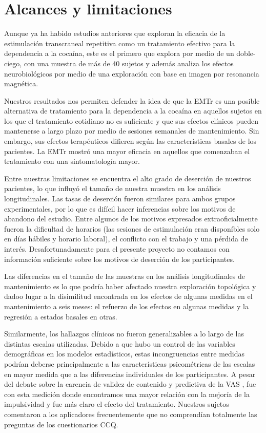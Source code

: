 \section{Alcances y limitaciones}
Aunque ya ha habido estudios anteriores que exploran la eficacia de la estimulación transcraneal repetitiva como un tratamiento efectivo para la dependencia a la cocaína, este es el primero que explora por medio de un doble-ciego, con una muestra de más de 40 sujetos y además analiza los efectos neurobiológicos por medio de una exploración con base en imagen por resonancia magnética. \par
Nuestros resultados nos permiten defender la idea de que la EMTr es una posible alternativa de tratamiento para la dependencia a la cocaína en aquellos sujetos en los que el tratamiento cotidiano no es suficiente y que sus efectos clínicos pueden mantenerse a largo plazo por medio de sesiones semanales de mantenimiento. Sin embargo, sus efectos terapéuticos difieren según las características basales de los pacientes. La EMTr mostró una mayor eficacia en aquellos que comenzaban el tratamiento con una sintomatología mayor. \par
Entre nuestras limitaciones se encuentra el alto grado de deserción de nuestros pacientes, lo que influyó el tamaño de nuestra muestra en los análisis longitudinales. Las tasas de deserción fueron similares para ambos grupos experimentales, por lo que es difícil hacer inferencias sobre los motivos de abandono del estudio. Entre algunos de los motivos expresados extraoficialmente fueron la dificultad de horarios (las sesiones de estimulación eran disponíbles solo en días hábiles y horario laboral), el conflicto con el trabajo y una pérdida de interés. Desafortunadamente para el presente proyecto no contamos con información suficiente sobre los motivos de deserción de los participantes.\par
Las diferencias en el tamaño de las muestras en los análisis longitudinales de mantenimiento es lo que podría haber afectado nuestra exploración topológica y dadoo lugar a la disimilitud encontrada en los efectos de algunas medidas en el mantenimiento a seis meses: el refuerzo de los efectos en algunas medidas y la regresión a estados basales en otras. \par
Similarmente, los hallazgos clínicos no fueron generalizables a lo largo de las distintas escalas utilizadas. Debido a que hubo un control de las variables demográficas en los modelos estadísticos, estas incongruencias entre medidas podrían deberse principalmente a las características psicométricas de las escalas en mayor medida que a las diferencias individuales de los participantes. A pesar del debate sobre la carencia de validez de contenido y predictiva de la VAS \parencite{Ekhtiari2019}, fue con esta medición donde encontramos una mayor relación con la mejoría de la impulsividad y fue más claro el efecto del tratamiento. Nuestros sujetos comentaron a los aplicadores frecuentemente que no comprendían totalmente las preguntas de los cuestionarios CCQ. \par
